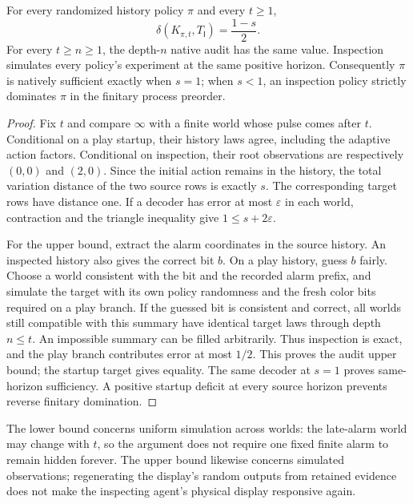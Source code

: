 \begin{theorem}\label{thm:next-alarm-audit}
For every randomized history policy $\pi$ and every $t\ge1$,
\[
 \delta(K_{\pi,t},T_{\mathsf I})=\frac{1-s}{2}.
\]
For every $t\ge n\ge1$, the depth-$n$ native audit has the same value.
Inspection simulates every policy's experiment at the same positive horizon.
Consequently $\pi$ is natively sufficient exactly when $s=1$; when $s<1$, an
inspection policy strictly dominates $\pi$ in the finitary process preorder.
\end{theorem}
\begin{proof}
Fix $t$ and compare $\infty$ with a finite world whose pulse comes after $t$.
Conditional on a play startup, their history laws agree, including the adaptive
action factors. Conditional on inspection, their root observations are respectively
$(0,0)$ and $(2,0)$. Since the initial action remains in the history, the total variation
distance of the two source rows is exactly $s$. The corresponding target rows
have distance one. If a decoder has error at most $\varepsilon$ in each world,
contraction and the triangle inequality give $1\le s+2\varepsilon$.

For the upper bound, extract the alarm coordinates in the source history. An inspected
history also gives the correct bit $b$. On a play history, guess $b$ fairly.
Choose a world consistent with the bit and the recorded alarm prefix, and
simulate the target with its own policy randomness and the fresh color bits
required on a play branch. If the
guessed bit is consistent and correct, all worlds still compatible with this
summary have identical target laws through depth $n\le t$. An impossible
summary can be filled arbitrarily. Thus inspection is exact, and the play
branch contributes error at most $1/2$. This proves the audit upper bound;
the startup target gives equality. The same decoder at $s=1$ proves
same-horizon sufficiency. A positive startup deficit at every source horizon
prevents reverse finitary domination.
\end{proof}

The lower bound concerns uniform simulation across worlds: the late-alarm world
may change with $t$, so the argument does not require one fixed finite alarm to
remain hidden forever. The upper bound likewise concerns simulated observations;
regenerating the display's random outputs from retained evidence does not make
the inspecting agent's physical display responsive again.

